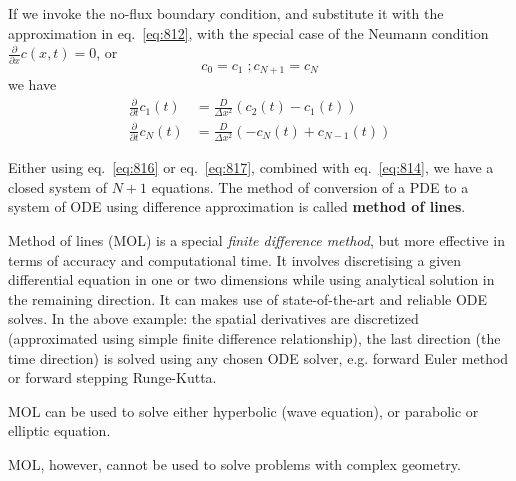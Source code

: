 If we invoke the no-flux boundary condition, and substitute it with
the approximation in eq.~\eqref{eq:812}, with the special case of the
Neumann condition $\frac{\partial}{\partial x}c(x,t) = 0$, or
\begin{equation}
  \label{eq:818}
  c_0 = c_1 \; ; c_{N+1} = c_N
\end{equation}
we have
\begin{equation}
  \label{eq:817}
  \begin{split}
    \frac{\partial }{\partial t} c_1(t) &= \frac{D}{\Delta
      x^2}(c_{2}(t)-c_1(t)) \\
    \frac{\partial }{\partial t} c_N(t) &= \frac{D}{\Delta
      x^2}(-c_N(t) + c_{N-1}(t))        
  \end{split}
\end{equation}

Either using eq.~\eqref{eq:816} or eq.~\eqref{eq:817}, combined with
eq.~\eqref{eq:814}, we have a closed system of $N+1$ equations. 
The method of conversion of a PDE to a system of ODE using difference
approximation is called {\bf method of lines}. 

\begin{framed}
  Method of lines (MOL) is a special {\it finite difference method},
  but more effective in terms of accuracy and computational time.  It
  involves discretising a given differential equation in one or two
  dimensions while using analytical solution in the remaining
  direction. It can makes use of state-of-the-art and reliable ODE
  solves. In the above example: the spatial derivatives are
  discretized (approximated using simple finite difference
  relationship), the last direction (the time direction) is solved
  using any chosen ODE solver, e.g. forward Euler method or forward
  stepping Runge-Kutta.
  
  MOL can be used to solve either hyperbolic (wave equation), or
  parabolic or elliptic equation. 

  MOL, however, cannot be used to solve problems with complex
  geometry. 
\end{framed}

